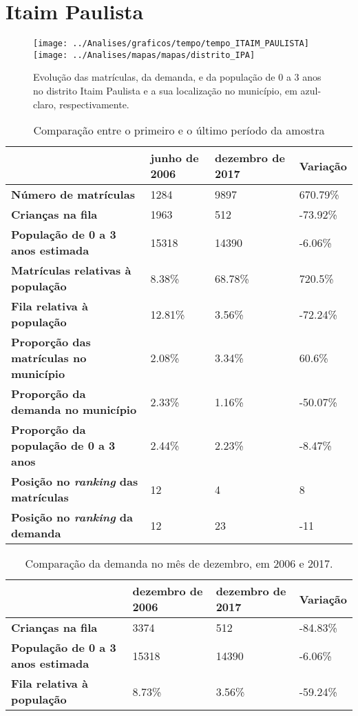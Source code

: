 \section{Itaim Paulista}
\begin{figure}[H]
\centering
\texttt{[image: ../Analises/graficos/tempo/tempo\_ITAIM\_PAULISTA]}
\texttt{[image: ../Analises/mapas/mapas/distrito\_IPA]}
\caption{Evolução das matrículas, da demanda, e da população de 0 a 3 anos no distrito Itaim Paulista e a sua localização no município, em azul-claro, respectivamente.}
\end{figure}
\begin{table}[H]
\begin{tabular}{l|l|l|l}
\textbf{}                                      & \textbf{junho de 2006}       & \textbf{dezembro de 2017}    & \textbf{Variação} \\ \hline
\textbf{Número de matrículas}                  & 1284 & 9897 & 670.79\% \\ \hline
\textbf{Crianças na fila}                      & 1963 & 512 & -73.92\% \\ \hline
\textbf{População de 0 a 3 anos estimada}      & 15318 & 14390 & -6.06\% \\ \hline
\textbf{Matrículas relativas à população}      & 8.38\% & 68.78\% & 720.5\% \\ \hline
\textbf{Fila relativa à população}             & 12.81\% & 3.56\% & -72.24\% \\ \hline
\textbf{Proporção das matrículas no município} & 2.08\% & 3.34\% & 60.6\% \\ \hline
\textbf{Proporção da demanda no município}     & 2.33\% & 1.16\% & -50.07\% \\ \hline
\textbf{Proporção da população de 0 a 3 anos}  & 2.44\% & 2.23\% & -8.47\% \\ \hline
\textbf{Posição no \textit{ranking} das matrículas}     & 12 & 4 & 8 \\ \hline
\textbf{Posição no \textit{ranking} da demanda}         & 12 & 23 & -11 \\ 
\end{tabular}
\caption{Comparação entre o primeiro e o último período da amostra}
\end{table}
\begin{table}[H]
\begin{tabular}{l|l|l|l}
\textbf{}                                 & \textbf{dezembro de 2006} & \textbf{dezembro de 2017} & \textbf{Variação} \\ \hline
\textbf{Crianças na fila}                      & 3374 & 512 & -84.83\% \\ \hline
\textbf{População de 0 a 3 anos estimada}      & 15318 & 14390 & -6.06\% \\ \hline
\textbf{Fila relativa à população}             & 8.73\% & 3.56\% & -59.24\% \\
\end{tabular}
\caption{Comparação da demanda no mês de dezembro, em 2006 e 2017.}
\end{table}
